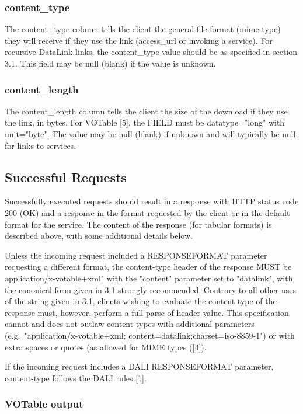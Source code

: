 \documentclass[11pt,a4paper]{ivoa}
\begin{document}
\subsubsection{content\_type}

The content\_type column tells the client the general file format
(mime-type) they will receive if they use the link
(access\_url or invoking a service).
For recursive DataLink links, the content\_type value should
be as specified in section 3.1.
This field may be null (blank) if the value is unknown.


\subsubsection{content\_length}

The content\_length column tells the client the size of the download
if they use the link, in bytes. For VOTable [5], the FIELD must be
datatype="long" with unit="byte". The value may be null (blank)
if unknown and will typically be null for links to services.


\subsection{Successful Requests}

Successfully executed requests should result in a response with HTTP
status code 200 (OK) and a response in the format requested by the client
or in the default format for the service. The content of the response
(for tabular formats) is described above,
with some additional details below.

Unless the incoming request included a RESPONSEFORMAT parameter requesting
a different format, the content-type header of the response MUST be
application/x-votable+xml" with the "content" parameter set to "datalink",
with the canonical form given in 3.1 strongly recommended. Contrary to
all other uses of the string given in 3.1, clients wishing to evaluate
the content type of the response must, however, perform a full parse
of header value. This specification cannot and does not outlaw content
types with additional parameters (e.g.\ "application/x-votable+xml;
content=datalink;charset=iso-8859-1") or with extra spaces or quotes
(as allowed for MIME types ([4]).

If the incoming request includes a DALI RESPONSEFORMAT parameter,
content-type follows the DALI rules [1].


\subsubsection{VOTable output}
\end{document}
